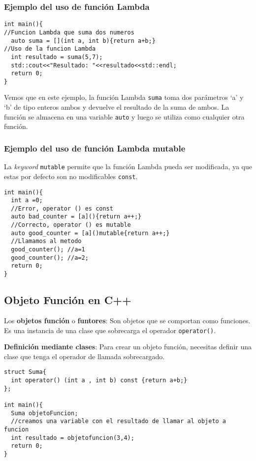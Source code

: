 \subsubsection{Ejemplo del uso de función Lambda}
\begin{center}
	\begin{lstlisting}[frame=single]
int main(){
//Funcion Lambda que suma dos numeros
  auto suma = [](int a, int b){return a+b;}
//Uso de la funcion Lambda
  int resultado = suma(5,7);
  std::cout<<"Resultado: "<<resultado<<std::endl;
  return 0;
}
	\end{lstlisting}
\end{center}
Vemos que en este ejemplo, la función Lambda \texttt{suma} toma dos parámetros ‘a’ y ‘b’ de tipo enteros ambos y devuelve el resultado de la suma de ambos.
La función se almacena en una variable \texttt{auto} y luego se utiliza como cualquier otra función.
\newpage
\subsubsection{Ejemplo del uso de función Lambda mutable}
La \textit{keyword} \texttt{mutable} permite que la función Lambda pueda ser modificada, ya que estas por defecto son no modificables \texttt{const}. 
\begin{center}
	\begin{lstlisting}[frame=single]
int main(){
  int a =0;
  //Error, operator () es const
  auto bad_counter = [a](){return a++;} 
  //Correcto, operator () es mutable
  auto good_counter = [a]()mutable{return a++;}
  //Llamamos al metodo
  good_counter(); //a=1
  good_counter(); //a=2;
  return 0;
}
	\end{lstlisting}
\end{center}

\subsection{Objeto Función en C++}
Los \textbf{objetos función} o \textbf{funtores}: Son objetos que se comportan como funciones. Es una instancia de una clase que sobrecarga el operador \texttt{operator()}. 

\textbf{Definición mediante clases}: Para crear un objeto función, necesitas definir una clase que tenga el operador de llamada sobrecargado.
\begin{center}
	\begin{lstlisting}[frame=single]
struct Suma{
  int operator() (int a , int b) const {return a+b;}
};

int main(){
  Suma objetoFuncion;
  //creamos una variable con el resultado de llamar al objeto a funcion
  int resultado = objetofuncion(3,4);
  return 0;
}
	\end{lstlisting}
\end{center}

